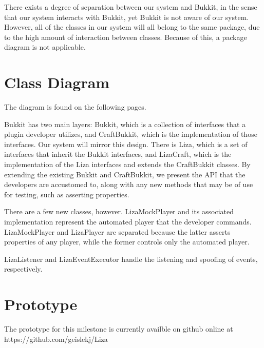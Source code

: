 \documentclass{article}
\begin{document}
There exists a degree of separation between our system and Bukkit, in the
sense that our system interacts with Bukkit, yet Bukkit is not aware of our
system. However, all of the classes in our system will all belong to the same
package, due to the high amount of interaction between classes. Because
of this, a package diagram is not applicable.

\section{Class Diagram}

The diagram is found on the following pages.
\newline

\noindent
Bukkit has two main layers: Bukkit, which is a collection of interfaces that
a plugin developer utilizes, and CraftBukkit, which is the implementation
of those interfaces. Our system will mirror this design. There is Liza, which
is a set of interfaces that inherit the Bukkit interfaces, and LizaCraft, which
is the implementation of the Liza interfaces and extends the CraftBukkit classes.
By extending the existing Bukkit and CraftBukkit, we present the API that
the developers are accustomed to, along with any new methods that may
be of use for testing, such as asserting properties. 
\newline

\noindent
There are a few new classes, however. LizaMockPlayer and its associated
implementation represent the automated player that the developer
commands. LizaMockPlayer and LizaPlayer are separated because the
latter asserts properties of any player, while the former controls only
the automated player.
\newline

\noindent
LizaListener and LizaEventExecutor handle the listening and spoofing of
events, respectively. 
\newline

\newpage


\newpage
\section{Prototype}

The prototype for this milestone is currently availble on github online at
https://github.com/geislekj/Liza
\end{document}
